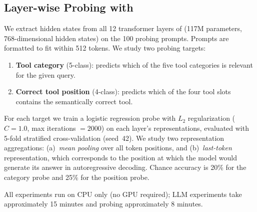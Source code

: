 \subsection{Layer-wise Probing with \gpttwo}
\label{sec:probing}

We extract hidden states from all 12 transformer layers of \gpttwo (117M parameters,
768-dimensional hidden states) on the 100 probing prompts.  Prompts are formatted to fit
within 512 tokens.  We study two probing targets:

\begin{enumerate}[leftmargin=*,itemsep=0pt,topsep=2pt]
    \item \textbf{Tool category} (5-class): predicts which of the five tool categories is
          relevant for the given query.
    \item \textbf{Correct tool position} (4-class): predicts which of the four tool slots
          contains the semantically correct tool.
\end{enumerate}

For each target we train a logistic regression probe with $L_2$ regularization
($C = 1.0$, max iterations $= 2000$) on each layer's representations, evaluated with
5-fold stratified cross-validation (seed~42).  We study two representation aggregations:
(a)~\emph{mean pooling} over all token positions, and (b)~\emph{last-token}
representation, which corresponds to the position at which the model would generate its
answer in autoregressive decoding.  Chance accuracy is 20\% for the category probe and
25\% for the position probe.

All experiments run on CPU only (no GPU required); LLM experiments take approximately
15 minutes and probing approximately 8 minutes.
